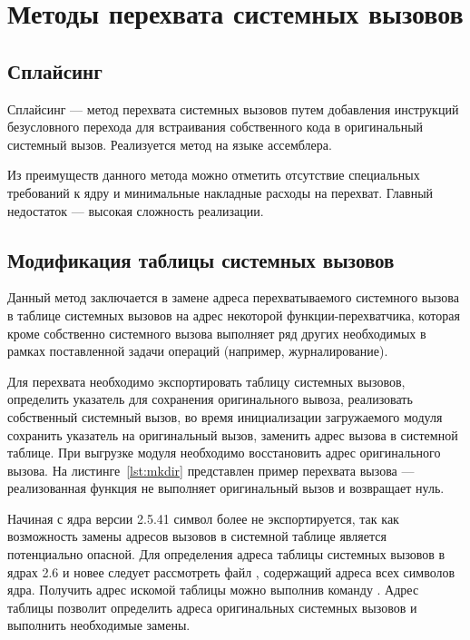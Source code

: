 \section{Методы перехвата системных вызовов}

\subsection{Сплайсинг}

Сплайсинг --- метод перехвата системных вызовов путем добавления инструкций безусловного перехода для встраивания собственного кода в оригинальный системный вызов. Реализуется метод на языке ассемблера.

Из преимуществ данного метода можно отметить отсутствие специальных требований к ядру и минимальные накладные расходы на перехват. Главный недостаток --- высокая сложность реализации.

\subsection{Модификация таблицы системных вызовов}

Данный метод заключается в замене адреса перехватываемого системного вызова в таблице системных вызовов на адрес некоторой функции-перехватчика, которая кроме собственно системного вызова выполняет ряд других необходимых в рамках поставленной задачи операций (например, журналирование).

Для перехвата необходимо экспортировать таблицу системных вызовов, определить указатель для сохранения оригинального вывоза, реализовать собственный системный вызов, во время инициализации загружаемого модуля сохранить указатель на оригинальный вызов, заменить адрес вызова в системной таблице. При выгрузке модуля необходимо восстановить адрес оригинального вызова. На листинге~\ref{lst:mkdir} представлен пример перехвата вызова  --- реализованная функция не выполняет оригинальный вызов и возвращает нуль.



Начиная с ядра версии 2.5.41 символ  более не экспортируется, так как возможность замены адресов вызовов в системной таблице является потенциально опасной.
Для определения адреса таблицы системных вызовов в ядрах 2.6 и новее следует рассмотреть файл , содержащий адреса всех символов ядра. Получить адрес искомой таблицы можно выполнив команду . Адрес таблицы позволит определить адреса оригинальных системных вызовов и выполнить необходимые замены.

